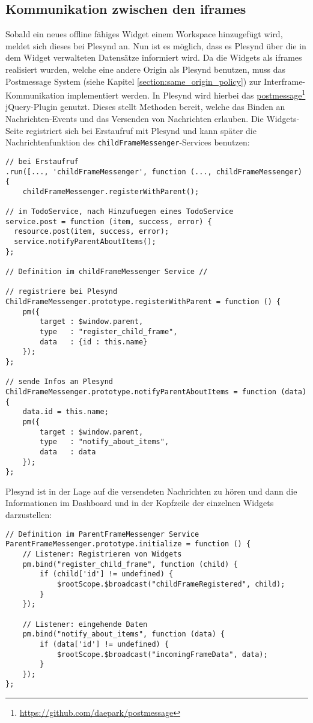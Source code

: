 \subsection{Kommunikation zwischen den iframes}\label{section:kommunikation_zwischen_iframes_implementierung}
Sobald ein neues offline fähiges Widget einem Workspace hinzugefügt wird, meldet sich dieses bei Plesynd an. Nun ist es möglich, dass es Plesynd über die in dem Widget verwalteten Datensätze informiert wird. Da die Widgets als iframes realisiert wurden, welche eine andere Origin als Plesynd benutzen, muss das Postmessage System (siehe Kapitel \ref{section:same_origin_policy}) zur Interframe-Kommunikation implementiert werden. In Plesynd wird hierbei das \href{https://github.com/daepark/postmessage}{postmessage}\footnote{\url{https://github.com/daepark/postmessage}} jQuery-Plugin genutzt. Dieses stellt Methoden bereit, welche das Binden an Nachrichten-Events und das Versenden von Nachrichten erlauben. Die Widgets-Seite registriert sich bei Erstaufruf mit Plesynd und kann später die Nachrichtenfunktion des \texttt{childFrameMessenger}-Services benutzen:
\begin{lstlisting}
// bei Erstaufruf
.run([..., 'childFrameMessenger', function (..., childFrameMessenger) {
    childFrameMessenger.registerWithParent();
    
// im TodoService, nach Hinzufuegen eines TodoService
service.post = function (item, success, error) {
  resource.post(item, success, error);
  service.notifyParentAboutItems();
};
   
// Definition im childFrameMessenger Service //

// registriere bei Plesynd
ChildFrameMessenger.prototype.registerWithParent = function () {
    pm({
        target : $window.parent,
        type   : "register_child_frame",
        data   : {id : this.name}
    });
};

// sende Infos an Plesynd
ChildFrameMessenger.prototype.notifyParentAboutItems = function (data) {
    data.id = this.name;
    pm({
        target : $window.parent,
        type   : "notify_about_items",
        data   : data
    });
};
\end{lstlisting}

Plesynd ist in der Lage auf die versendeten Nachrichten zu hören und dann die Informationen im Dashboard und in der Kopfzeile der einzelnen Widgets darzustellen:
\begin{lstlisting}
// Definition im ParentFrameMessenger Service
ParentFrameMessenger.prototype.initialize = function () {
    // Listener: Registrieren von Widgets
    pm.bind("register_child_frame", function (child) {
        if (child['id'] != undefined) {
            $rootScope.$broadcast("childFrameRegistered", child);
        }
    });

    // Listener: eingehende Daten
    pm.bind("notify_about_items", function (data) {
        if (data['id'] != undefined) {
            $rootScope.$broadcast("incomingFrameData", data);
        }
    });
};
\end{lstlisting}

